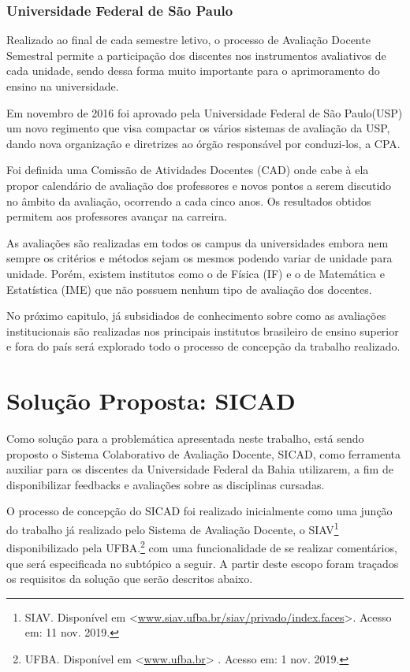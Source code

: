 \documentclass[12pt, a4paper]{report}
\begin{document}
\subsection{Universidade Federal de São Paulo}

Realizado ao final de cada semestre letivo, o processo de Avaliação Docente Semestral permite a participação dos discentes nos instrumentos avaliativos de cada unidade, sendo dessa forma muito importante para o aprimoramento do ensino na universidade.

Em novembro de 2016 foi aprovado pela Universidade Federal de São Paulo(USP) um novo regimento que visa compactar os vários sistemas de avaliação da USP, dando nova organização e diretrizes ao órgão responsável por conduzi-los, a CPA.

Foi definida uma Comissão de Atividades Docentes (CAD) onde cabe à ela propor calendário de avaliação dos professores e novos pontos a serem discutido no âmbito da avaliação, ocorrendo a cada cinco anos. Os resultados obtidos permitem aos professores avançar na carreira.

As avaliações são realizadas em todos os campus da universidades embora nem sempre os critérios e métodos sejam os mesmos podendo variar de unidade para unidade. Porém, existem institutos como o de Física (IF) e o de Matemática e Estatística (IME) que não possuem nenhum tipo de avaliação dos docentes.

No próximo capitulo, já subsidiados de conhecimento sobre como as avaliações institucionais são realizadas nos principais institutos brasileiro de ensino superior e fora do país será explorado todo o processo de concepção da trabalho realizado.


\chapter{Solução Proposta: SICAD}

Como solução para a problemática apresentada neste trabalho, está sendo proposto o Sistema Colaborativo de Avaliação Docente, SICAD, como ferramenta auxiliar para os discentes da Universidade Federal da Bahia utilizarem, a fim de disponibilizar feedbacks e avaliações sobre as disciplinas cursadas. 

O processo de concepção do SICAD foi realizado inicialmente como uma junção do trabalho já realizado pelo Sistema de Avaliação Docente, o SIAV\footnote{SIAV. Disponível em <\url{www.siav.ufba.br/siav/privado/index.faces}>. Acesso em: 11 nov. 2019.} disponibilizado pela \ac{UFBA}.\footnote{UFBA. Disponível em <\url{www.ufba.br}> . Acesso em: 1 nov. 2019.} com uma funcionalidade de se realizar comentários, que será especificada no subtópico a seguir. A partir deste escopo foram traçados os requisitos da solução que serão descritos abaixo.
\end{document}
